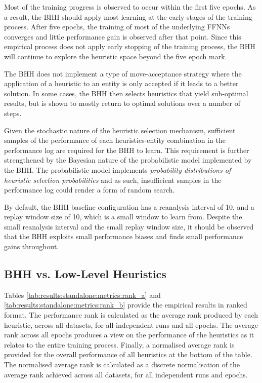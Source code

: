 \documentclass[preprint,review,12pt]{elsarticle}
\begin{document}
Most of the training progress is observed to occur within the first five epochs. As a result, the \acs{BHH} should apply most learning at the early stages of the training process. After five epochs, the training of most of the underlying \acp{FFNN} converges and little performance gain is observed after that point. Since this empirical process does not apply early stopping of the training process, the \acs{BHH} will continue to explore the heuristic space beyond the five epoch mark.

The \acs{BHH} does not implement a type of move-acceptance strategy where the application of a heuristic to an entity is only accepted if it leads to a better solution. In some cases, the \acs{BHH} then selects heuristics that yield sub-optimal results, but is shown to mostly return to optimal solutions over a number of steps.

Given the stochastic nature of the heuristic selection mechanism, sufficient samples of the performance of each heuristics-entity combination in the performance log are required for the \acs{BHH} to learn. This requirement is further strengthened by the Bayesian nature of the probabilistic model implemented by the \acs{BHH}. The probabilistic model implements \textit{probability distributions of heuristic selection probabilities} and as such, insufficient samples in the performance log could render a form of random search.

By default, the \acs{BHH} baseline configuration has a reanalysis interval of 10, and a replay window size of 10, which is a small window to learn from. Despite the small reanalysis interval and the small replay window size, it should be observed that the \acs{BHH} exploits small performance biases and finds small performance gains throughout.

\subsection{BHH vs. Low-Level Heuristics}\label{sec:results:standalone}

Tables \ref{tab:results:standalone:metrics:rank_a} and \ref{tab:results:standalone:metrics:rank_b} provide the empirical results in ranked format. The performance rank is calculated as the average rank produced by each heuristic, across all datasets, for all independent runs and all epochs. The average rank across all epochs produces a view on the performance of the heuristics as it relates to the entire training process. Finally, a normalised average rank is provided for the overall performance of all heuristics at the bottom of the table. The normalised average rank is calculated as a discrete normalisation of the average rank achieved across all datasets, for all independent runs and epochs.
\end{document}
